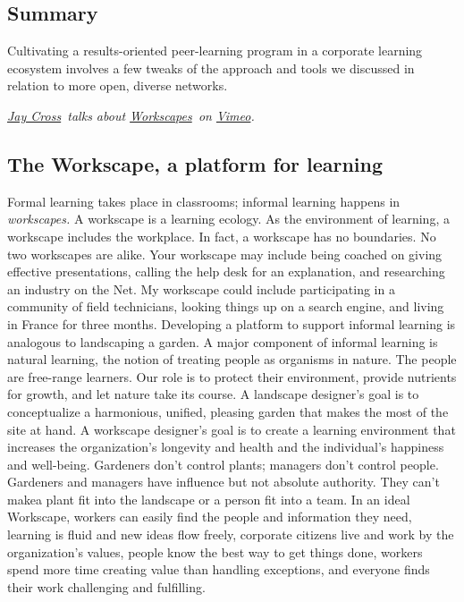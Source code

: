 \subsection{Summary}

Cultivating a results-oriented peer-learning program in a corporate
learning ecosystem involves a few tweaks of the approach and tools we
discussed in relation to more open, diverse networks.

\emph{\href{http://vimeo.com/user7021511}{Jay Cross}~talks about
\emph{\href{http://vimeo.com/45989904}{Workscapes}~}on
\href{http://vimeo.com}{Vimeo}.}

\subsection{The Workscape, a platform for learning}

Formal learning takes place in classrooms; informal learning happens in
\emph{workscapes.} A workscape is a learning ecology. As the environment
of learning, a workscape includes the workplace. In fact, a workscape
has no boundaries. No two workscapes are alike. Your workscape may
include being coached on giving effective presentations, calling the
help desk for an explanation, and researching an industry on the Net. My
workscape could include participating in a community of field
technicians, looking things up on a search engine, and living in France
for three months. Developing a platform to support informal learning is
analogous to landscaping a garden. A major component of informal
learning is natural learning, the notion of treating people as organisms
in nature. The people are free-range learners. Our role is to protect
their environment, provide nutrients for growth, and let nature take its
course. A landscape designer's goal is to conceptualize a harmonious,
unified, pleasing garden that makes the most of the site at hand. A
workscape designer's goal is to create a learning environment that
increases the organization's longevity and health and the individual's
happiness and well-being. Gardeners don't control plants; managers don't
control people. Gardeners and managers have influence but not absolute
authority. They can't make\emph{}a plant fit into the landscape or a
person fit into a team. In an ideal Workscape, workers can easily find
the people and information they need, learning is fluid and new ideas
flow freely, corporate citizens live and work by the organization's
values, people know the best way to get things done, workers spend more
time creating value than handling exceptions, and everyone finds their
work challenging and fulfilling.

